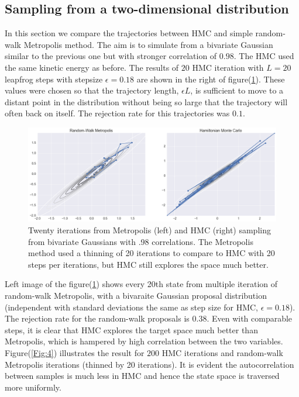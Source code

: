 \documentclass{article}
\numberwithin{equation}{section}
\begin{document}
\subsection{Sampling from a two-dimensional distribution}
In this section we compare the trajectories between HMC and simple random-walk Metropolis method. The aim is to simulate from a bivariate Gaussian similar to the previous one but with stronger correlation of $0.98$. The HMC used the same kinetic energy as before. The results of $20$ HMC iteration with $L=20$ leapfrog steps with stepsize $\epsilon = 0.18$ are shown in the right of figure(\ref{Fig:3}). These values were chosen so that the trajectory length, $\epsilon L$, is sufficient to move to a distant point in the distribution without being so large that the trajectory will often back on itself. The rejection rate for this trajectories was $0.1$.
\begin{figure}[H]
\centering
  \includegraphics[width=1\linewidth]{MH_HMC_double_position.png}
  \caption{Twenty iterations from Metropolis (left) and HMC (right) sampling from bivariate Gaussians with .98 correlations.  The Metropolis method used a thinning of 20 iterations to compare to HMC with 20 steps per iterations, but HMC still explores the space much better.}
\label{Fig:3}
\end{figure}

Left image of the figure(\ref{Fig:3}) shows every 20th state from multiple iteration of random-walk Metropolis, with a bivaraite Gaussian proposal distribution (independent with standard deviations the same as step size for HMC, $\epsilon = 0.18$). The rejection rate for the random-walk proposals is $0.38$. Even with comparable steps, it is clear that HMC explores the target space much better than Metropolis, which is hampered by high correlation between the two variables.\\

Figure(\ref{Fig:4}) illustrates the result for $200$ HMC iterations and random-walk Metropolis iterations (thinned by 20 iterations). It is evident the autocorrelation between samples is much less in HMC and hence the state space is traversed more uniformly.
\end{document}
